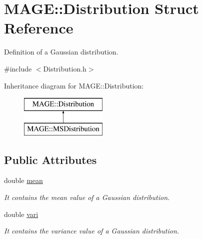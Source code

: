 \hypertarget{struct_m_a_g_e_1_1_distribution}{\section{M\-A\-G\-E\-:\-:Distribution Struct Reference}
\label{struct_m_a_g_e_1_1_distribution}
}


Definition of a Gaussian distribution.  




{\ttfamily \#include $<$Distribution.\-h$>$}

Inheritance diagram for M\-A\-G\-E\-:\-:Distribution\-:\begin{figure}[H]
\begin{center}
\leavevmode
\includegraphics[height=2.000000cm]{struct_m_a_g_e_1_1_distribution}
\end{center}
\end{figure}
\subsection*{Public Attributes}
\begin{DoxyCompactItemize}
\item 
\hypertarget{struct_m_a_g_e_1_1_distribution_a604ebb36706e149529946d2028a178eb}{double \hyperlink{struct_m_a_g_e_1_1_distribution_a604ebb36706e149529946d2028a178eb}{mean}}\label{struct_m_a_g_e_1_1_distribution_a604ebb36706e149529946d2028a178eb}

\begin{DoxyCompactList}\small\item\em It contains the mean value of a Gaussian distribution. \end{DoxyCompactList}\item 
\hypertarget{struct_m_a_g_e_1_1_distribution_a9e2f2aa03bb780e60bb402d6eb5c941d}{double \hyperlink{struct_m_a_g_e_1_1_distribution_a9e2f2aa03bb780e60bb402d6eb5c941d}{vari}}\label{struct_m_a_g_e_1_1_distribution_a9e2f2aa03bb780e60bb402d6eb5c941d}

\begin{DoxyCompactList}\small\item\em It contains the variance value of a Gaussian distribution. \end{DoxyCompactList}\end{DoxyCompactItemize}



